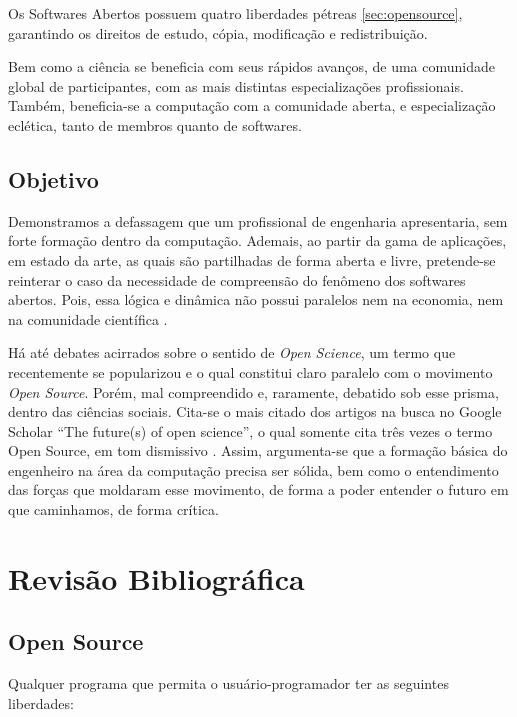 \documentclass[
12pt,				%
openright,			%
oneside,			%
a4paper,			%
english,			%
french,				%
spanish,			%
brazil,				%
]{abntex2}
\begin{document}
Os Softwares Abertos possuem quatro liberdades pétreas \autoref{sec:opensource}, garantindo os direitos de estudo, cópia, modificação e redistribuição.

Bem como a ciência se beneficia com seus rápidos avanços, de uma comunidade global de participantes, com as mais distintas especializações profissionais. Também, beneficia-se a computação com a comunidade aberta, e especialização eclética, tanto de membros quanto de softwares.



\section{Objetivo}

Demonstramos a defassagem que um profissional de engenharia apresentaria, sem forte formação dentro da computação. Ademais, ao partir da gama de aplicações, em estado da arte, as quais são partilhadas de forma aberta e livre, pretende-se reinterar o caso da necessidade de compreensão do fenômeno dos softwares abertos. Pois, essa lógica e dinâmica não possui paralelos nem na economia, nem na comunidade científica \cite{hippel2003open,peters2009open}.

Há até debates acirrados sobre o sentido de \textit{Open Science}, um termo que recentemente se popularizou e o qual constitui claro paralelo com o movimento \textit{Open Source}. Porém, mal compreendido e, raramente, debatido sob esse prisma, dentro das ciências sociais. Cita-se o mais citado dos artigos na busca no Google Scholar ``The future(s) of open science'', o qual somente cita três vezes o termo Open Source, em tom dismissivo \cite{mirowski2018future}. Assim, argumenta-se que a formação básica do engenheiro na área da computação precisa ser sólida, bem como o entendimento das forças que moldaram esse movimento, de forma a poder entender o futuro em que caminhamos, de forma crítica.



\chapter{Revisão Bibliográfica}
\section{Open Source}
\label{sec:opensource}
Qualquer programa que permita o usuário-programador ter as seguintes liberdades:
\end{document}
